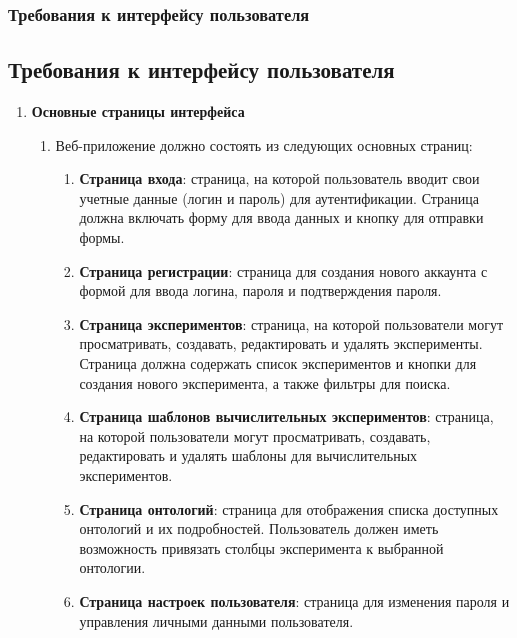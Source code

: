 \documentclass[a4paper,12pt,reqno]{article}
\begin{document}
    \subsubsection{Требования к интерфейсу пользователя}

    \subsection{Требования к интерфейсу пользователя} \label{ui-requirements}

    \begin{enumerate}
        \item \textbf{Основные страницы интерфейса}
        \begin{enumerate}[label=\arabic{enumi}.\arabic*.]
            \item Веб-приложение должно состоять из следующих основных страниц:
            \begin{enumerate}[label=\arabic{enumi}.\arabic{enumii}.\arabic*.]
                \item \textbf{Страница входа}: страница, на которой пользователь вводит свои учетные данные (логин и пароль) для аутентификации. Страница должна включать форму для ввода данных и кнопку для отправки формы.
                \item \textbf{Страница регистрации}: страница для создания нового аккаунта с формой для ввода логина, пароля и подтверждения пароля.
                \item \textbf{Страница экспериментов}: страница, на которой пользователи могут просматривать, создавать, редактировать и удалять эксперименты. Страница должна содержать список экспериментов и кнопки для создания нового эксперимента, а также фильтры для поиска.
                \item \textbf{Страница шаблонов вычислительных экспериментов}: страница, на которой пользователи могут просматривать, создавать, редактировать и удалять шаблоны для вычислительных экспериментов.
                \item \textbf{Страница онтологий}: страница для отображения списка доступных онтологий и их подробностей. Пользователь должен иметь возможность привязать столбцы эксперимента к выбранной онтологии.
                \item \textbf{Страница настроек пользователя}: страница для изменения пароля и управления личными данными пользователя.
            \end{enumerate}
        \end{enumerate}


\end{enumerate}
\end{document}
